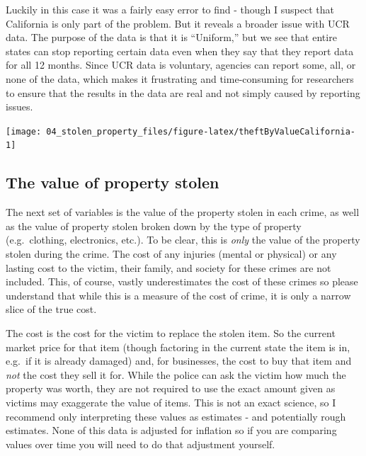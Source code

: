 \documentclass[
]{krantz}
\let\origfigure\figure
\let\endorigfigure\endfigure
\renewenvironment{figure}[1][2] {
    \expandafter\origfigure\expandafter[H]
} {
    \endorigfigure
}
\begin{document}
Luckily in this case it was a fairly easy error to find -
though I suspect that California is only part of the
problem. But it reveals a broader issue with UCR data. The
purpose of the data is that it is ``Uniform,'' but we see
that entire states can stop reporting certain data even when
they say that they report data for all 12 months. Since UCR
data is voluntary, agencies can report some, all, or none of
the data, which makes it frustrating and time-consuming for
researchers to ensure that the results in the data are real
and not simply caused by reporting issues.

\begin{figure}

{\centering \texttt{[image: 04\_stolen\_property\_files/figure-latex/theftByValueCalifornia-1]} 

}

\caption{The annual breakdown in total theft value by the three value categories: less than \$50, \$50-\$199, and \$200 and over, among agencies in California that reported 12 months of data in that year, 1960-1980}\label{fig:theftByValueCalifornia}
\end{figure}

\subsection{The value of property
stolen}\label{the-value-of-property-stolen}

The next set of variables is the value of the property
stolen in each crime, as well as the value of property
stolen broken down by the type of property (e.g.~clothing,
electronics, etc.). To be clear, this is \emph{only} the
value of the property stolen during the crime. The cost of
any injuries (mental or physical) or any lasting cost to the
victim, their family, and society for these crimes are not
included. This, of course, vastly underestimates the cost of
these crimes so please understand that while this is a
measure of the cost of crime, it is only a narrow slice of
the true cost.

The cost is the cost for the victim to replace the stolen
item. So the current market price for that item (though
factoring in the current state the item is in, e.g.~if it is
already damaged) and, for businesses, the cost to buy that
item and \emph{not} the cost they sell it for. While the
police can ask the victim how much the property was worth,
they are not required to use the exact amount given as
victims may exaggerate the value of items. This is not an
exact science, so I recommend only interpreting these values
as estimates - and potentially rough estimates. None of this
data is adjusted for inflation so if you are comparing
values over time you will need to do that adjustment
yourself.
\end{document}
